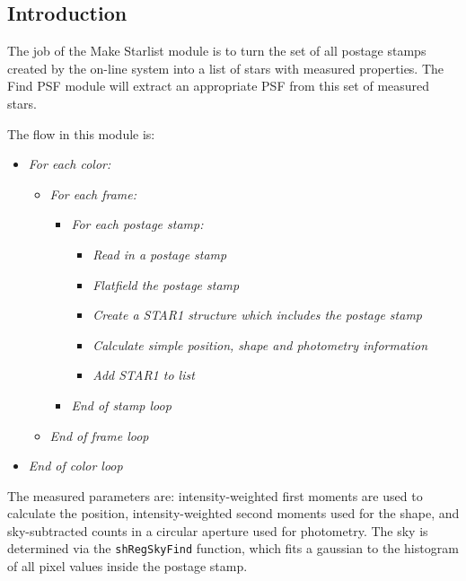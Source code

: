 
\subsection{Introduction}

  The job of the Make Starlist module is to turn the set of all
postage stamps created by the on-line system into a list of 
stars with measured properties.  The Find PSF module will 
extract an appropriate PSF from this set of measured stars.

  The flow in this module is:
\begin{itemize}
\item {\it For each color:}
\begin{itemize}
\item {\it For each frame:}
\begin{itemize}
\item {\it For each postage stamp:}
\begin{itemize}
\item {\it Read in a postage stamp}
\item {\it Flatfield the postage stamp}
\item {\it Create a STAR1 structure which includes the postage stamp}
\item {\it Calculate simple position, shape and photometry information}
\item {\it Add STAR1 to list}
\end{itemize}
\item {\it End of stamp loop}
\end{itemize}
\item {\it End of frame loop}
\end{itemize}
\item {\it End of color loop}
\end{itemize}

The measured parameters are: 
intensity-weighted first moments are used to calculate the position, 
intensity-weighted second moments used for the shape,
and sky-subtracted counts in a circular aperture used for photometry.
The sky is determined via the {\tt shRegSkyFind} function,
which fits a gaussian to the histogram of all pixel values
inside the postage stamp.
